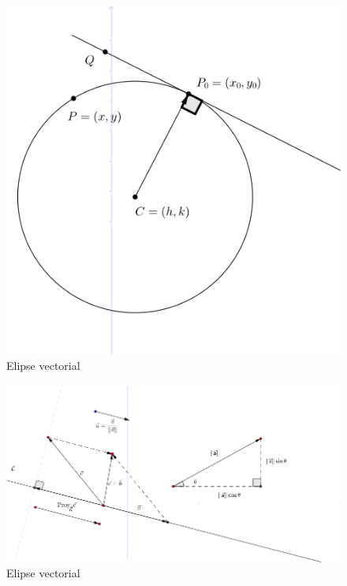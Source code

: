 \documentclass[12pt,]{report}
\theoremstyle{definition}
\theoremstyle{definition}
\theoremstyle{definition}
\theoremstyle{remark}
\begin{document}
\begin{figure}

{\centering \includegraphics{circunferencia} 

}

\caption{Elipse vectorial}\label{fig:C1}
\end{figure}

\begin{figure}

{\centering \includegraphics{vector} 

}

\caption{Elipse vectorial}\label{fig:C2}
\end{figure}
\end{document}
